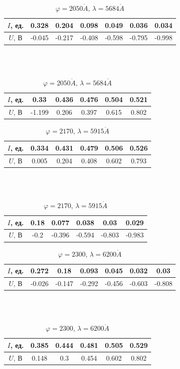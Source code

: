 \documentclass[a4paper, 12pt]{article}
\renewcommand{\phi}{\varphi}
\renewcommand{\AA}{\ensuremath{\mathring{A}}}
\begin{document}
\begin{table}[!h]
    \centering
    \begin{tabular}{|c|c|c|c|c|c|c|}
        \hline
        $I$, ед. & 0.328 & 0.204 & 0.098 & 0.049 & 0.036 & 0.034\\ \hline
        $U$, В   & -0.045 & -0.217 & -0.408 & -0.598 & -0.795 & -0.998
        \\ \hline
    \end{tabular}
    \\~\\
    \begin{tabular}{|c|c|c|c|c|c|}
        \hline
        $I$, ед. & 0.33 & 0.436 & 0.476 & 0.504 & 0.521\\ \hline
        $U$, В   & -1.199 & 0.206 & 0.397 & 0.615 & 0.802
        \\ \hline
    \end{tabular}
    \caption {$\phi = 2050 \AA$, $\lambda = 5684 \AA$}
\end{table}

\begin{table}[!h]
    \centering
    \begin{tabular}{|c|c|c|c|c|c|}
        \hline
        $I$, ед. & 0.334 & 0.431 & 0.479 & 0.506 & 0.526\\ \hline
        $U$, В   & 0.005 & 0.204 & 0.408 & 0.602 & 0.793
        \\ \hline
    \end{tabular}
    \\~\\
    \begin{tabular}{|c|c|c|c|c|c|}
        \hline
        $I$, ед. & 0.18 & 0.077 & 0.038 & 0.03 & 0.029\\ \hline
        $U$, В   & -0.2 & -0.396 & -0.594 & -0.803 & -0.983
        \\ \hline
    \end{tabular}
    \caption {$\phi = 2170$, $\lambda = 5915 \AA$}
\end{table}

\begin{table}[!h]
    \centering
    \begin{tabular}{|c|c|c|c|c|c|c|}
        \hline
        $I$, ед. & 0.272 & 0.18 & 0.093 & 0.045 & 0.032 & 0.03\\ \hline
        $U$, В   & -0.026 & -0.147 & -0.292 & -0.456 & -0.603 & -0.808
        \\ \hline
    \end{tabular}
    \\~\\
    \begin{tabular}{|c|c|c|c|c|c|}
        \hline
        $I$, ед. & 0.385 & 0.444 & 0.481 & 0.505 & 0.529\\ \hline
        $U$, В   & 0.148 & 0.3 & 0.454 & 0.602 & 0.802
        \\ \hline
    \end{tabular}
    \caption {$\phi = 2300$, $\lambda = 6200 \AA$}
\end{table}
\end{document}
